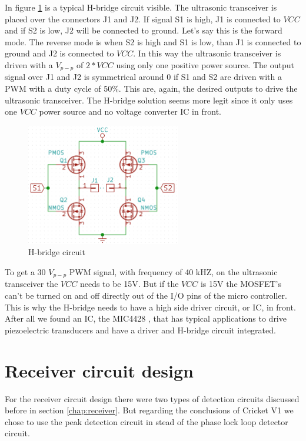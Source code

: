 In figure \ref{fig:h_bridge} is a typical H-bridge circuit visible. The ultrasonic transceiver is placed over the connectors J1 and J2. If signal S1 is high, J1 is connected to $VCC$ and if S2 is low, J2 will be connected to ground. Let's say this is the forward mode. The reverse mode is when S2 is high and S1 is low, than J1 is connected to ground and J2 is connected to $VCC$. In this way the ultrasonic transceiver is driven with a $V_{p-p}$ of $2 * VCC$ using only one positive power source. The output signal over J1 and J2 is symmetrical around 0 if S1 and S2 are driven with a PWM with a duty cycle of 50\%. This are, again, the desired outputs to drive the ultrasonic transceiver. The H-bridge solution seems more legit since it only uses one $VCC$ power source and no voltage converter IC in front.

\begin{figure}[H]
\centering
\includegraphics[width=0.6\textwidth]{Figures/hbridge.PNG}
\caption{H-bridge circuit}
\label{fig:h_bridge}
\end{figure}

To get a 30 $V_{p-p}$ PWM signal, with frequency of 40 kHZ, on the ultrasonic transceiver the $VCC$ needs to be 15V. But if the $VCC$ is 15V the MOSFET's can't be turned on and off directly out of the I/O pins of the micro controller. This is why the H-bridge needs to have a high side driver circuit, or IC, in front. After all we found an IC, the MIC4428 \cite{MIC4428}, that has typical applications to drive piezoelectric transducers and have a driver and H-bridge circuit integrated.

\section{Receiver circuit design}
\label{chap:receivercircuit}
For the receiver circuit design there were two types of detection circuits discussed before in section \ref{chap:receiver}. But regarding the conclusions of Cricket V1 we chose to use the peak detection circuit in stead of the phase lock loop detector circuit.

